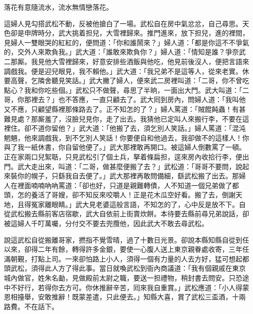 \begin{myquote}
落花有意隨流水，流水無情戀落花。
\end{myquote}

這婦人見勾搭武松不動，反被他搶白了一場。武松自在房中氣忿忿，自己尋思。天色卻是申牌時分，武大挑着担兒，大雪裡歸來。推門進來，放下担兒，進的裡間，見婦人一雙眼哭的紅紅的，便問道：「你和誰鬧來？」婦人道：「都是你這不不爭氣的，交外人來欺負我。」武大道：「誰敢來欺負你？」婦人道：「情知是誰？爭奈武二那厮。我見他大雪裡歸來，好意安排些酒飯與他吃，他見前後沒人，便把言語來調戲我。便是迎兒眼見，我不賴他。」武大道：「我兄弟不是這等人，從來老實。休要高聲，乞隣舍聽見笑話。」{}武大撇了婦人，便來武二房裡叫道：「二哥，你不曾吃點心？我和你吃些個。」武松只不做聲，尋思了半晌，一面出大門。武大叫道：「二哥，你那裡去？」也不答應，一直只顧去了。武大囘到房內，問婦人道：「我叫他又不應，只顧望縣裡那條路去了。正不知怎的了？」婦人罵道：「賊餛飩蟲！有甚難見處？那厮羞了，沒臉兒見你，{}走了出去。我猜他已定叫人來搬行李，不要在這裡住。卻不道你留他？」武大道：「他搬了去，須乞別人笑話。」婦人罵道：「混沌魍魎，他來調戲我，到不乞別人笑話！你要便自和他過去，我卻做不的這樣人！你與了我一紙休書，你自留他便了。」武大那裡敢再開口。被這婦人倒數罵了一頓。正在家兩口兒絮聒，只見武松引了個土兵，拏着條扁担，逕來房內收拾行李，便出門。武大走出來，叫道：「二哥，做甚麼便搬了去？」武松道：「哥哥不要問，說起來裝你的幌子，只繇我自去便了。」武大那裡再敢問備細，繇武松搬了出去。那婦人在裡面喃喃吶吶罵道：「卻也好，只道是親難轉債，人不知道一個兄弟做了都頭，怎的養活了哥嫂，卻不知反來咬嚼人！{}正是花木瓜空好看。搬了去，倒謝天地，且得冤家離眼睛。」{}武大見老婆這般言語，不知怎的了，心中反是放不下。自從武松搬去縣前客店宿歇，武大自依前上街賣炊餅。本待要去縣前尋兄弟說話，卻被這婦人千叮萬囑，分付交不要去兜攬他，因此武大不敢去尋武松。

說這武松自從搬離哥家，撚指不覺雪晴，過了十數日光景。卻說本縣知縣自從到任以來，卻得二年有餘，轉得許多金銀，{}要使一心腹人送上東京親眷處收寄，三年任滿朝覲，打點上司。一來卻怕路上小人，須得一個有力量的人去方好，猛可想起都頭武松，須得此人方了得此事。當日就喚武松到衙內商議道：「我有個親戚在東京城內做官，姓朱名勔，見做殿前太尉之職，要送一担禮物，稍封書去問安。只恐途中不好行，若得你去方可。你休推辭辛苦，囘來我自重賞。」武松應道：「小人得蒙恩相擡舉，安敢推辭！既蒙差遣，只此便去。」知縣大喜，賞了武松三盃酒，十兩路費。不在話下。

